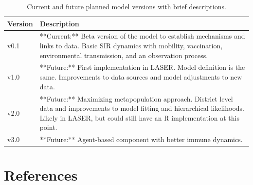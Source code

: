 \documentclass[
]{book}
\begin{document}
\begin{table}

\caption{\label{tab:unnamed-chunk-1}Current and future planned model versions with brief descriptions.}
\centering
\begin{tabular}[t]{l|l}
\hline
Version & Description\\
\hline
v0.1 & **Current:** Beta version of the model to establish mechanisms and links to data. Basic SIR dynamics with mobility, vaccination, environmental transmission, and an observation process.\\
\hline
v1.0 & **Future:** First implementation in LASER. Model definition is the same. Improvements to data sources and model adjustments to new data.\\
\hline
v2.0 & **Future:** Maximizing metapopulation approach. District level data and improvements to model fitting and hierarchical likelihoods. Likely in LASER, but could still have an R implementation at this point.\\
\hline
v3.0 & **Future:** Agent-based component with better immune dynamics.\\
\hline
\end{tabular}
\end{table}

\chapter{References}\label{references-1}

  
\end{document}
